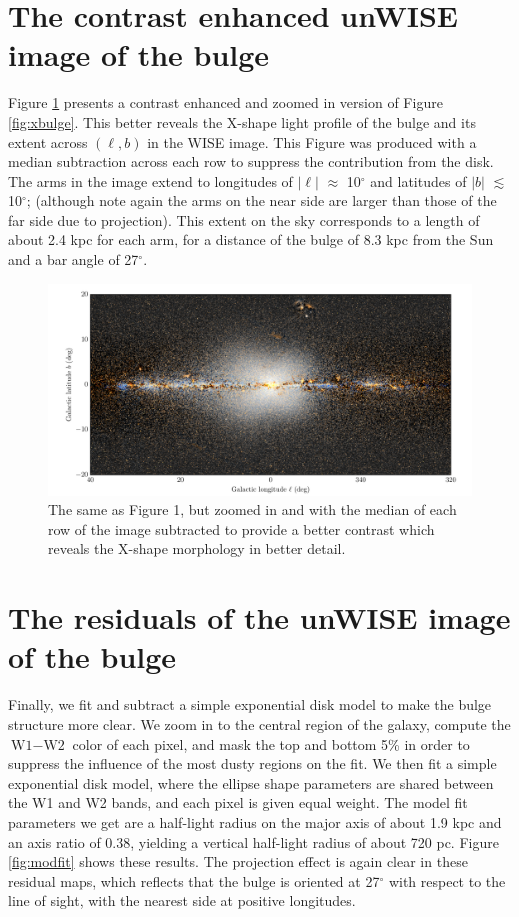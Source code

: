\documentclass[12pt, preprint]{aastex}
\begin{document}
\section{The contrast enhanced unWISE image of the bulge}

Figure \ref{fig:filt} presents a contrast enhanced and zoomed in version of Figure \ref{fig:xbulge}. This better reveals the X-shape light profile of the bulge and its extent across $(\ell,b)$ in the WISE image. This Figure was produced with a median subtraction across each row to suppress the contribution from the disk. The arms in the image extend to longitudes of $|\ell|$ $\approx$ 10$^\circ$ and latitudes of $|b|$ $\lesssim$ 10$^\circ$; (although note again the arms on the near side are larger than those of the far side due to projection). This extent on the sky corresponds to a length of about 2.4 kpc for each arm, for a distance of the bulge of 8.3 kpc from the Sun and a bar angle of 27$^\circ$.

\begin{figure}[h!]
\centering
        \includegraphics[width=\textwidth]{xbulge-01}
\caption{The same as Figure 1, but zoomed in and with the median of each row of the image subtracted to provide a better contrast which reveals the X-shape morphology in better detail.}
\label{fig:filt}
\end{figure}

\section{The residuals of the unWISE image of the bulge}

Finally, we fit and subtract a simple exponential disk model to make the bulge structure more clear.  We zoom in to the central region of the galaxy, compute the $\textrm{W1} - \textrm{W2}$ color of each pixel, and mask the top and bottom 5\% in order to suppress the influence of the most dusty regions on the fit.  We then fit a simple exponential disk model, where the ellipse shape parameters are shared between the W1 and W2 bands, and each pixel is given equal weight.
The model fit parameters we get are a half-light radius on the major axis of about 1.9 kpc and an axis ratio of 0.38, yielding a vertical half-light radius of about 720 pc.
Figure \ref{fig:modfit} shows these results.
The projection effect is again clear in these residual maps, which reflects that the bulge is oriented at 27$^\circ$ with respect to the line of sight, with the nearest side at  positive longitudes. %
\end{document}
